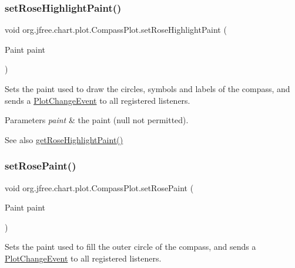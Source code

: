 \subsubsection{\texorpdfstring{set\+Rose\+Highlight\+Paint()}{setRoseHighlightPaint()}}
{\footnotesize\ttfamily void org.\+jfree.\+chart.\+plot.\+Compass\+Plot.\+set\+Rose\+Highlight\+Paint (\begin{DoxyParamCaption}\item[{Paint}]{paint }\end{DoxyParamCaption})}

Sets the paint used to draw the circles, symbols and labels of the compass, and sends a \mbox{\hyperlink{}{Plot\+Change\+Event}} to all registered listeners.


\begin{DoxyParams}{Parameters}
{\em paint} & the paint ({\ttfamily null} not permitted).\\
\hline
\end{DoxyParams}
\begin{DoxySeeAlso}{See also}
\mbox{\hyperlink{classorg_1_1jfree_1_1chart_1_1plot_1_1_compass_plot_a555cfe75f1011e0e8bcd236a6fc865aa}{get\+Rose\+Highlight\+Paint()}} 
\end{DoxySeeAlso}
\mbox{\label{classorg_1_1jfree_1_1chart_1_1plot_1_1_compass_plot_acf31acd8f0bb61bbab25e161c2e98768}} 
\subsubsection{\texorpdfstring{set\+Rose\+Paint()}{setRosePaint()}}
{\footnotesize\ttfamily void org.\+jfree.\+chart.\+plot.\+Compass\+Plot.\+set\+Rose\+Paint (\begin{DoxyParamCaption}\item[{Paint}]{paint }\end{DoxyParamCaption})}

Sets the paint used to fill the outer circle of the compass, and sends a \mbox{\hyperlink{}{Plot\+Change\+Event}} to all registered listeners.


